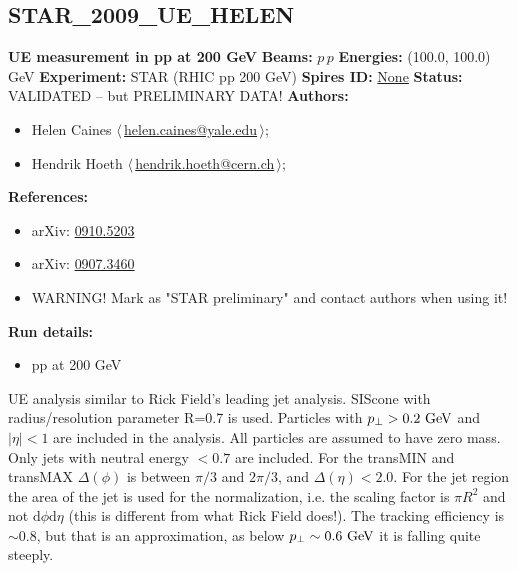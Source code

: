 \subsection{STAR\_2009\_UE\_HELEN}
\textbf{UE measurement in pp at 200 GeV}\newline
\textbf{Beams:} $p$\,$p$ \newline
\textbf{Energies:} (100.0, 100.0) GeV \newline
\textbf{Experiment:} STAR (RHIC pp 200 GeV) \newline
\textbf{Spires ID:} \href{http://www.slac.stanford.edu/spires/find/hep/www?rawcmd=key+None}{None}\newline
\textbf{Status:} VALIDATED -- but PRELIMINARY DATA!\newline
\textbf{Authors:}
\begin{itemize}
  \item Helen Caines $\langle\,$\href{mailto:helen.caines@yale.edu}{helen.caines@yale.edu}$\,\rangle$;
  \item Hendrik Hoeth $\langle\,$\href{mailto:hendrik.hoeth@cern.ch}{hendrik.hoeth@cern.ch}$\,\rangle$;
\end{itemize}
\textbf{References:}
\begin{itemize}
  \item arXiv: \href{http://arxiv.org/abs/0910.5203}{0910.5203}
  \item arXiv: \href{http://arxiv.org/abs/0907.3460}{0907.3460}
  \item WARNING! Mark as "STAR preliminary" and contact authors when using it!
\end{itemize}
\textbf{Run details:}
\begin{itemize}

  \item pp at 200 GeV\end{itemize}

\noindent UE analysis similar to Rick Field's leading jet analysis. SIScone with radius/resolution parameter R=0.7 is used. Particles with $p_\perp > 0.2~\text{GeV}$ and $|\eta| < 1$ are included in the analysis. All particles are assumed to have zero mass. Only jets with neutral energy $< 0.7$ are included. For the transMIN and transMAX $\Delta(\phi)$ is between $\pi/3$ and $2\pi/3$, and $\Delta(\eta) < 2.0$. For the jet region the area of the jet is used for the normalization, i.e. the scaling factor is $\pi R^2$ and not $\mathrm{d}\phi\mathrm{d}\eta$ (this is different from what Rick Field does!). The tracking efficiency is $\sim 0.8$, but that is an approximation, as below $p_\perp \sim 0.6~\text{GeV}$ it is falling quite steeply.

